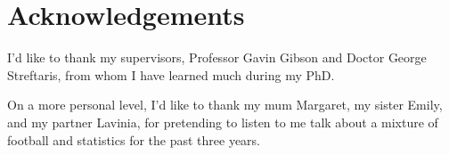 %

\singlespacing
\chapter*{Acknowledgements}
\onehalfspacing

I'd like to thank my supervisors, Professor Gavin Gibson and Doctor George Streftaris, from whom I have learned much
during my PhD.

On a more personal level, I'd like to thank my mum Margaret, my sister Emily, and my partner Lavinia, for pretending
to listen to me talk about a mixture of football and statistics for the past three years.



